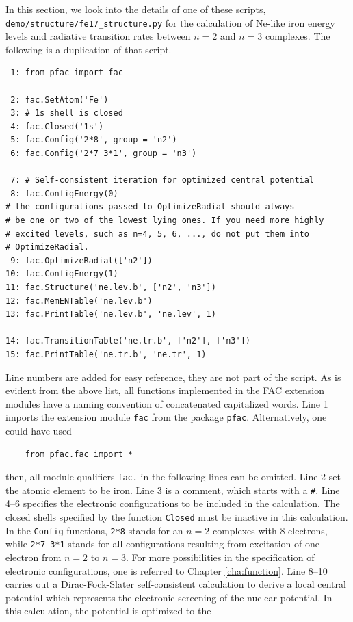 \documentclass[twoside,letterpaper]{refrep}
\begin{document}
In this section, we look into the details of one of these scripts,
\verb|demo/structure/fe17_structure.py| for the calculation of Ne-like iron
energy levels and radiative transition rates between $n = 2$ and $n = 3$
complexes. The following is a duplication of that script.
\begin{verbatim}
 1: from pfac import fac

 2: fac.SetAtom('Fe')
 3: # 1s shell is closed
 4: fac.Closed('1s')
 5: fac.Config('2*8', group = 'n2')
 6: fac.Config('2*7 3*1', group = 'n3')

 7: # Self-consistent iteration for optimized central potential
 8: fac.ConfigEnergy(0)
# the configurations passed to OptimizeRadial should always
# be one or two of the lowest lying ones. If you need more highly
# excited levels, such as n=4, 5, 6, ..., do not put them into
# OptimizeRadial.
 9: fac.OptimizeRadial(['n2'])
10: fac.ConfigEnergy(1)
11: fac.Structure('ne.lev.b', ['n2', 'n3'])
12: fac.MemENTable('ne.lev.b')
13: fac.PrintTable('ne.lev.b', 'ne.lev', 1)

14: fac.TransitionTable('ne.tr.b', ['n2'], ['n3'])
15: fac.PrintTable('ne.tr.b', 'ne.tr', 1)
\end{verbatim}
Line numbers are added for easy reference, they are not part of the script. 
As is evident from the above list, all functions implemented in the FAC
extension modules have a naming convention of concatenated capitalized words.
Line 1 imports the extension module \verb|fac| from the package \verb|pfac|.
Alternatively, one could have used
\begin{verbatim}
    from pfac.fac import *
\end{verbatim}
then, all module qualifiers \verb|fac.| in the following lines can be omitted.
Line 2 set the atomic element to be iron. Line 3 is a comment, which starts
with a \verb|#|. Line 4--6 specifies the electronic configurations to be
included in the calculation. The closed shells specified by the function
\verb|Closed| must be inactive in this calculation. In the \verb|Config|
functions, \verb|2*8| stands for an $n = 2$ complexes with 8 electrons, while
\verb|2*7 3*1| stands for all configurations resulting from excitation of one
electron from $n = 2$ to $n = 3$. For more possibilities in the specification
of electronic configurations, one is referred to Chapter \ref{cha:function}.
Line 8--10 carries out a Dirac-Fock-Slater self-consistent calculation to
derive a local central potential which represents the electronic screening of
the nuclear potential. In this calculation, the potential is optimized to the
\end{document}
